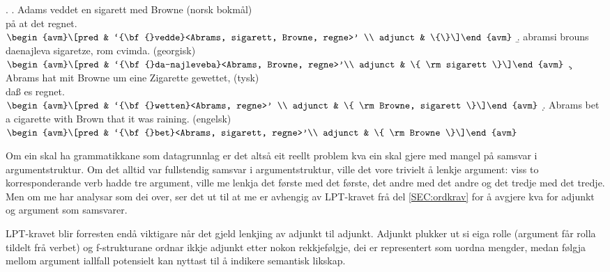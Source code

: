 \documentclass[11pt,a4paper,oneside,draft]{book}
\begin{document}
{\avmoptions{}
\ex. \label{ex:vedde}
\a. Adams veddet en sigarett med Browne \hfill{} (norsk bokmål)\\ på at det regnet.\\
    $\\\begin{avm}\[pred & `{\bf{}vedde}<Abrams, sigarett, Browne, regne>' \\
                 adjunct & \{\}\]\end{avm}\\$
\b. abramsi brouns daenajleva sigaretze, rom cvimda. \hfill{} (georgisk)\\
    $\\\begin{avm}\[pred &  `{\bf{}da-najleveba}<Abrams, Browne, regne>'\\
    adjunct &  \{ \rm sigarett \}\]\end{avm}\\$ 
\c. Abrams hat mit Browne um eine Zigarette gewettet, \hfill{}(tysk)\\
    daß es regnet.\\
    $\\\begin{avm}\[pred & `{\bf{}wetten}<Abrams, regne>' \\
                  adjunct & \{ \rm Browne, sigarett \}\]\end{avm}\\$
\d. Abrams bet a cigarette with Brown that it was raining. \hfill{}(engelsk)\\
    $\\\begin{avm}\[pred & `{\bf{}bet}<Abrams, sigarett, regne>'\\
                  adjunct & \{ \rm Browne \}\]\end{avm}$

}

Om ein skal ha grammatikkane som datagrunnlag er det altså eit reellt
problem kva ein skal gjere med mangel på samsvar i
argumentstruktur. Om det alltid var fullstendig samsvar i
argumentstruktur, ville det vore trivielt å lenkje argument: viss to
korresponderande verb hadde tre argument, ville me lenkja det første
med det første, det andre med det andre og det tredje med det
tredje. Men om me har analysar som dei over, ser det ut til at me er
avhengig av LPT-kravet frå del \ref{SEC:ordkrav} for å avgjere kva for
adjunkt og argument som samsvarer. 

LPT-kravet blir forresten endå viktigare når det gjeld lenkjing av
adjunkt til adjunkt. Adjunkt plukker ut si eiga rolle (argument får
rolla tildelt frå verbet) og f-strukturane ordnar ikkje adjunkt etter
nokon rekkjefølgje, dei er representert som uordna mengder, medan
følgja mellom argument iallfall potensielt kan nyttast til å indikere
semantisk likskap.
\end{document}
